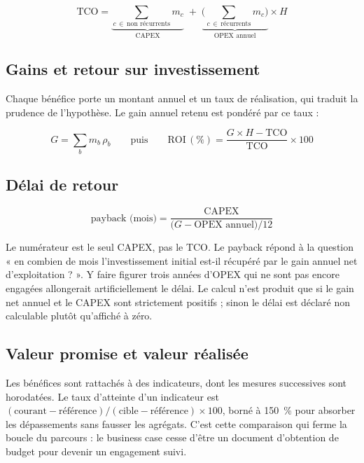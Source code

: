 \begin{equation}
\text{TCO} = \underbrace{\sum_{c \,\in\, \text{non récurrents}} m_c}_{\text{CAPEX}}
\; + \;
\underbrace{\Big(\sum_{c \,\in\, \text{récurrents}} m_c\Big)}_{\text{OPEX annuel}} \times H
\label{eq:tco}
\end{equation}

\subsection{Gains et retour sur investissement}

Chaque bénéfice porte un montant annuel et un taux de réalisation, qui traduit la
prudence de l'hypothèse. Le gain annuel retenu est pondéré par ce taux :

\begin{equation}
G = \sum_{b} m_b \, \rho_b
\qquad\text{puis}\qquad
\text{ROI}\,(\%) = \frac{G \times H - \text{TCO}}{\text{TCO}} \times 100
\label{eq:roi}
\end{equation}

\subsection{Délai de retour}

\begin{equation}
\text{payback (mois)} = \frac{\text{CAPEX}}{\big(G - \text{OPEX annuel}\big) / 12}
\label{eq:payback}
\end{equation}

Le numérateur est le seul CAPEX, pas le TCO. Le payback répond à la question « en
combien de mois l'investissement initial est-il récupéré par le gain annuel net
d'exploitation ? ». Y faire figurer trois années d'OPEX qui ne sont pas encore engagées
allongerait artificiellement le délai. Le calcul n'est produit que si le gain net annuel
et le CAPEX sont strictement positifs ; sinon le délai est déclaré non calculable plutôt
qu'affiché à zéro.

\subsection{Valeur promise et valeur réalisée}

Les bénéfices sont rattachés à des indicateurs, dont les mesures successives sont
horodatées. Le taux d'atteinte d'un indicateur est
$(\text{courant} - \text{référence}) / (\text{cible} - \text{référence}) \times 100$,
borné à 150~\% pour absorber les dépassements sans fausser les agrégats. C'est cette
comparaison qui ferme la boucle du parcours : le business case cesse d'être un document
d'obtention de budget pour devenir un engagement suivi.

